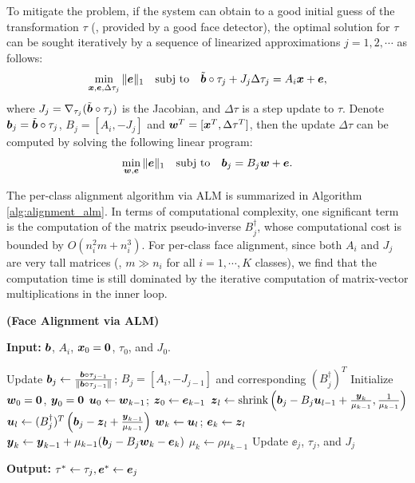 \documentclass[10pt,twocolumn,letterpaper]{article}
\begin{document}
To mitigate the problem, if the system can obtain to a good initial guess of the transformation $\tau$ (\eg, provided by a good face detector),
the optimal solution for $\tau$ can be sought iteratively by a sequence of linearized approximations $j=1, 2, \cdots$ as follows:
\begin{equation}
\min_{{\boldsymbol{x}}, {\boldsymbol{e}}, \Delta \tau_j}\|{\boldsymbol{e}}\|_1\quad \textup{subj to}\quad \tilde{{\boldsymbol{b}}}\circ\tau_j +  J_j\Delta \tau_j = A_i{\boldsymbol{x}} + {\boldsymbol{e}},
\end{equation}
where $J_j = \nabla_{\tau_j}(\tilde{{\boldsymbol{b}}}\circ\tau_j)$ is the Jacobian, and
$\Delta \tau$ is a step update to $\tau$. Denote ${\boldsymbol{b}}_j =
\tilde{{\boldsymbol{b}}}\circ\tau_j$, $B_j = [A_i, -J_j]$ and ${\boldsymbol{w}}^T = [{\boldsymbol{x}}^T, \Delta
\tau^T]$, then the update $\Delta \tau$ can be computed by solving the
following linear program:
\begin{equation}
\min_{{\boldsymbol{w}}, {\boldsymbol{e}}}\|{\boldsymbol{e}}\|_1\quad \textup{subj to}\quad {\boldsymbol{b}}_j = B_j{\boldsymbol{w}} + {\boldsymbol{e}}.
\label{eq:alignment-linearization}
\end{equation}

The per-class alignment algorithm via ALM is summarized in Algorithm
\ref{alg:alignment_alm}. In terms of computational complexity, one significant
term is the computation of the matrix pseudo-inverse $B_j^\dagger$, whose
computational cost is bounded by $O(n_i^2m + n_i^3)$. For per-class face
alignment, since both $A_i$ and $J_{j}$ are very tall matrices (\ie, $m\gg n_i$
for all $i=1, \cdots, K$ classes), we find that the computation time is still
dominated by the iterative computation of matrix-vector multiplications in the
inner loop.
\begin{algorithm}[ht!]
\caption{\bf (Face Alignment via ALM)} \label{alg:alignment_alm}
{\bf Input:} ${\boldsymbol{b}}$, $A_i$, ${\boldsymbol{x}}_0 = \boldsymbol{0}$, $\tau_0$, and $J_0$.
\begin{algorithmic}[1]
\STATE Update ${\boldsymbol{b}}_j \leftarrow \frac{{\boldsymbol{b}}\circ \tau_{j-1}}{\|{\boldsymbol{b}}\circ \tau_{j-1}\|}$; $B_j= [A_i, -J_{j-1}]$ and corresponding $(B_j^\dagger)^T$
\STATE Initialize ${\boldsymbol{w}}_0 = \boldsymbol 0$, ${\boldsymbol{y}}_0 = \boldsymbol 0$
\STATE ${\boldsymbol{u}}_0\leftarrow {\boldsymbol{w}}_{k-1}$; ${\boldsymbol{z}}_0\leftarrow {\boldsymbol{e}}_{k-1}$
\STATE ${\boldsymbol{z}}_l \leftarrow \mbox{shrink}\left({\boldsymbol{b}}_j - B_j{\boldsymbol{u}}_{l-1} + \frac{{\boldsymbol{y}}_{k}}{\mu_{k-1}}, \frac{1}{\mu_{k-1}}\right)$
\STATE ${\boldsymbol{u}}_l \leftarrow (B_j^\dagger)^T \left({\boldsymbol{b}}_j - {\boldsymbol{z}}_{l} + \frac{{\boldsymbol{y}}_{k-1}}{\mu_{k-1}} \right) $
\ENDWHILE
\STATE ${\boldsymbol{w}}_k \leftarrow {\boldsymbol{u}}_l$; ${\boldsymbol{e}}_k \leftarrow {\boldsymbol{z}}_l$
\STATE ${\boldsymbol{y}}_{k} \leftarrow {\boldsymbol{y}}_{k-1} + \mu_{k-1} ({\boldsymbol{b}}_j - B_j{\boldsymbol{w}}_{k} - \boldsymbol{e}_{k})$
\STATE $\mu_{k} \leftarrow \rho\mu_{k-1}$
\ENDWHILE
\STATE Update $\ee_j$, $\tau_j$, and $J_j$
\ENDWHILE
\end{algorithmic}
{\bf Output:} $\tau^*\leftarrow \tau_j, \boldsymbol{e}^*\leftarrow {\boldsymbol{e}}_j$
\end{algorithm}
\end{document}
